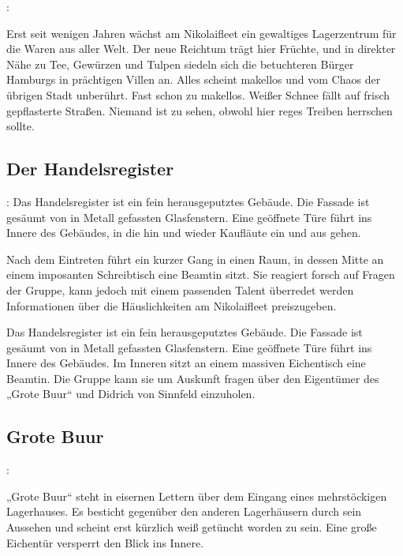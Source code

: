 :

Erst seit wenigen Jahren wächst am Nikolaifleet ein gewaltiges Lagerzentrum für die Waren aus aller Welt. Der neue Reichtum trägt hier Früchte, und in direkter Nähe zu Tee, Gewürzen und Tulpen siedeln sich die betuchteren Bürger Hamburgs in prächtigen Villen an. Alles scheint makellos und vom Chaos der übrigen Stadt unberührt. Fast schon zu makellos. Weißer Schnee fällt auf frisch gepflasterte Straßen. Niemand ist zu sehen, obwohl hier reges Treiben herrschen sollte.

\subsection*{Der Handelsregister}
\label{handelsregister}

:
Das Handelsregister ist ein fein herausgeputztes Gebäude. Die Fassade ist gesäumt von in Metall gefassten Glasfenstern. Eine geöffnete Türe führt ins Innere des Gebäudes, in die hin und wieder Kaufläute ein und aus gehen.

Nach dem Eintreten führt ein kurzer Gang in einen Raum, in dessen Mitte an einem imposanten Schreibtisch eine Beamtin sitzt.
Sie reagiert forsch auf Fragen der Gruppe, kann jedoch mit einem passenden Talent überredet werden Informationen über die Häuslichkeiten am Nikolaifleet preiszugeben.


Das Handelsregister ist ein fein herausgeputztes Gebäude. Die Fassade ist gesäumt von in Metall gefassten Glasfenstern. Eine geöffnete Türe führt ins Innere des Gebäudes. Im Inneren sitzt an einem
massiven Eichentisch eine Beamtin. Die Gruppe kann sie um Auskunft fragen über den Eigentümer des „Grote Buur“ und Didrich von Sinnfeld einzuholen.

\subsection*{Grote Buur}
\label{"grote buur"}

:

„Grote Buur“ steht in eisernen Lettern über dem Eingang eines mehrstöckigen Lagerhauses. Es besticht gegenüber den anderen Lagerhäusern durch sein Aussehen und scheint erst kürzlich weiß getüncht worden zu sein. Eine große Eichentür versperrt den Blick ins Innere.

